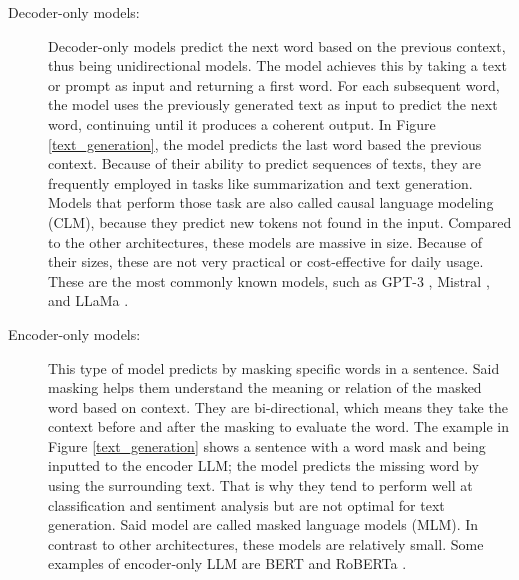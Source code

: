 \begin{description}

\item[Decoder-only models:] Decoder-only models predict the next word based on the previous context, thus being unidirectional models. The model achieves this by taking a text or prompt as input and returning 
a first word. For each subsequent word, the model uses the previously generated text as input to predict the next word, continuing until it produces a coherent output. In Figure \ref{text_generation},
the model predicts the last word based the previous context. Because of their ability to predict sequences of texts, they are frequently employed in tasks like summarization and text generation. Models
that perform those task are also called causal language modeling (CLM), because they predict new tokens not found in the input. Compared to the other architectures, these models are massive
in size. Because of their sizes, these are not very practical or cost-effective for daily usage. These are the most commonly known models, such as GPT-3 \cite{DBLP:journals/corr/abs-2005-14165},
Mistral \cite{jiang2023mistral7b}, and LLaMa \cite{touvron2023llamaopenefficientfoundation}.

\item[Encoder-only models:] This type of model predicts by masking specific words in a sentence. Said masking helps them understand the meaning or relation of the masked word based on context. They are bi-directional,
which means they take the context before and after the masking to evaluate the word. The example in Figure \ref{text_generation} shows a sentence with a word mask and being inputted to
the encoder LLM; the model predicts the missing word by using the surrounding text. That is why they tend to perform well at classification and sentiment analysis but are not optimal for text
generation. Said model are called masked language models (MLM). In contrast to other architectures, these models are relatively small. Some examples of encoder-only LLM are BERT
\cite{DBLP:journals/corr/abs-1810-04805} and RoBERTa \cite{liu2019robertarobustlyoptimizedbert}.


\end{description}
